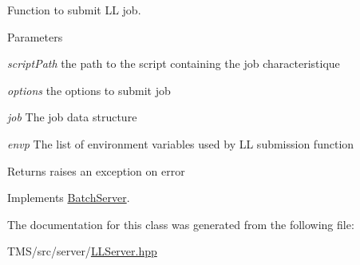 Function to submit LL job. 


\begin{DoxyParams}{Parameters}
\item[{\em scriptPath}]the path to the script containing the job characteristique \item[{\em options}]the options to submit job \item[{\em job}]The job data structure \item[{\em envp}]The list of environment variables used by LL submission function \end{DoxyParams}
\begin{DoxyReturn}{Returns}
raises an exception on error 
\end{DoxyReturn}


Implements \hyperlink{classBatchServer_a078c0f8605e770c02b8eca0351526f59}{BatchServer}.



The documentation for this class was generated from the following file:\begin{DoxyCompactItemize}
\item 
TMS/src/server/\hyperlink{LLServer_8hpp}{LLServer.hpp}\end{DoxyCompactItemize}
